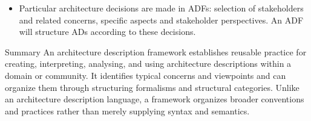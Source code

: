 \documentclass[10pt,letterpaper]{article}
\begin{document}
\begin{CornellNotesTable}
{\begin{itemize}[leftmargin=*,nosep,topsep=1pt]
\item Particular architecture decisions are made in ADFs: selection of stakeholders and related concerns, specific aspects and stakeholder perspectives. An ADF will structure ADs according to these decisions.
\end{itemize}}
\end{CornellNotesTable}


\begin{CornellSummaryBox}{Summary}
An architecture description framework establishes reusable practice for creating, interpreting, analysing, and using architecture descriptions within a domain or community. It identifies typical concerns and viewpoints and can organize them through structuring formalisms and structural categories. Unlike an architecture description language, a framework organizes broader conventions and practices rather than merely supplying syntax and semantics.
\end{CornellSummaryBox}
\end{document}
